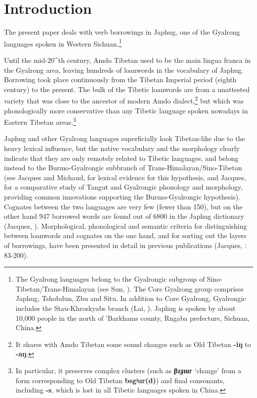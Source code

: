 \documentclass[oneside,a4paper,11pt]{article}
\newcommand{\ipa}[1]{{\phon\textbf{\mbox{#1}}}} %
\begin{document}
\section{Introduction}
The present paper deals with verb borrowings in Japhug, one of the Gyalrong languages spoken in Western Sichuan.\footnote{The Gyalrong languages belong to the Gyalrongic subgroup of Sino-Tibetan/Trans-Himalayan (see Sun, \citeyear{jackson00puxi}). The Core Gyalrong group comprises Japhug, Tshobdun, Zbu and Situ. In addition to Core Gyalrong, Gyalrongic includes the Stau-Khroskyabs branch (Lai, \citeyear{lai15person}). Japhug is spoken by about 10,000 people in the north of 'Barkhams county, Rngaba prefecture, Sichuan, China. } 

Until the mid-20^{th} century, Amdo Tibetan used to be the main lingua franca in the Gyalrong area, leaving hundreds of loanwords in the vocabulary of Japhug. Borrowing took place continuously from the Tibetan Imperial period (eighth century) to the present. The bulk of the Tibetic loanwords are from a unattested variety that was close to the ancestor of modern Amdo dialect,\footnote{It shares with Amdo Tibetan some sound changes such as Old Tibetan \ipa{-iŋ} to \ipa{-aŋ}. } but which was phonologically more conservative than any Tibetic language spoken nowadays in Eastern Tibetan areas.\footnote{In particular, it preserves complex clusters (such as \ipa{βzɟɯr} `change' from a form corresponding to Old Tibetan \ipa{bsgʲur(d)}) and final consonants, including \ipa{-s}, which is lost in all Tibetic languages spoken in China.} 

Japhug and other Gyalrong languages superficially look Tibetan-like due to the heavy lexical influence, but the native vocabulary and the morphology clearly indicate that they are only remotely related to Tibetic languages, and belong instead to the Burmo-Gyalrongic subbranch of Trans-Himalayan/Sino-Tibetan (see Jacques and Michaud, \citeyear{jacques.michaud11naish} for lexical evidence for this hypothesis, and Jacques, \citeyear{jacques14esquisse} for a comparative study of Tangut and Gyalrongic phonology and morphology, providing common innovations supporting the Burmo-Gyalrongic hypothesis). Cognates between the two languages are very few (fewer than 150), but on the other hand 947 borrowed words are found out of 6800 in the Japhug dictionary (Jacques, \citeyear{jacques15japhug}). Morphological, phonological and semantic criteria for distinguishing between loanwords and cognates on the one hand, and for sorting out the layers of borrowings, have been presented in detail in previous publications (Jacques, \citeyear{jacques04these}: 83-200). 
\end{document}
